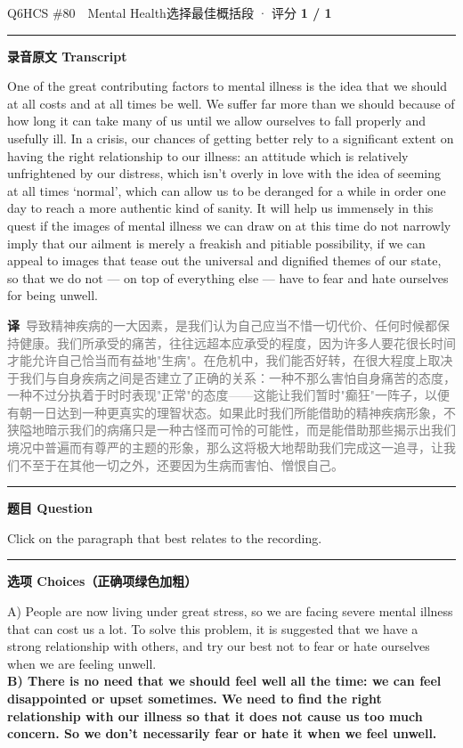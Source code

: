 \documentclass[11pt]{article}
\newcommand{\ptesub}[1]{%
  \par\needspace{2\baselineskip}\smallskip
  {\color{cAccent}\rule[-0.2ex]{3pt}{1.05em}}\hspace{6pt}%
  {\bfseries\color{cHead}#1}\par\nopagebreak\smallskip}
\newcommand{\zh}[1]{{\footnotesize\textcolor{cNote}{\textbf{译}}\ \textcolor{gray}{#1}}}
\begin{document}
\begin{qblock}{Q6\quad HCS \#80\ \ Mental Health}{选择最佳概括段 · 评分 \textcolor{cAccent}{\bfseries 1 / 1}}
\ptesub{录音原文 Transcript}
\begin{promptbox}
One of the great contributing factors to mental illness is the idea that we should at all costs and at all times be well. We suffer far more than we should because of how long it can take many of us until we allow ourselves to fall properly and usefully ill. In a crisis, our chances of getting better rely to a significant extent on having the right relationship to our illness: an attitude which is relatively unfrightened by our distress, which isn't overly in love with the idea of seeming at all times `normal', which can allow us to be deranged for a while in order one day to reach a more authentic kind of sanity. It will help us immensely in this quest if the images of mental illness we can draw on at this time do not narrowly imply that our ailment is merely a freakish and pitiable possibility, if we can appeal to images that tease out the universal and dignified themes of our state, so that we do not --- on top of everything else --- have to fear and hate ourselves for being unwell.
\end{promptbox}
\zh{导致精神疾病的一大因素，是我们认为自己应当不惜一切代价、任何时候都保持健康。我们所承受的痛苦，往往远超本应承受的程度，因为许多人要花很长时间才能允许自己恰当而有益地"生病"。在危机中，我们能否好转，在很大程度上取决于我们与自身疾病之间是否建立了正确的关系：一种不那么害怕自身痛苦的态度，一种不过分执着于时时表现"正常"的态度——这能让我们暂时"癫狂"一阵子，以便有朝一日达到一种更真实的理智状态。如果此时我们所能借助的精神疾病形象，不狭隘地暗示我们的病痛只是一种古怪而可怜的可能性，而是能借助那些揭示出我们境况中普遍而有尊严的主题的形象，那么这将极大地帮助我们完成这一追寻，让我们不至于在其他一切之外，还要因为生病而害怕、憎恨自己。}
\ptesub{题目 Question}
\begin{notebox}Click on the paragraph that best relates to the recording.\end{notebox}
\ptesub{选项 Choices（正确项绿色加粗）}
{\small
A) People are now living under great stress, so we are facing severe mental illness that can cost us a lot. To solve this problem, it is suggested that we have a strong relationship with others, and try our best not to fear or hate ourselves when we are feeling unwell.\\
{\color{cFix}\textbf{B) There is no need that we should feel well all the time: we can feel disappointed or upset sometimes. We need to find the right relationship with our illness so that it does not cause us too much concern. So we don't necessarily fear or hate it when we feel unwell.}}\\
}
\end{qblock}
\end{document}
